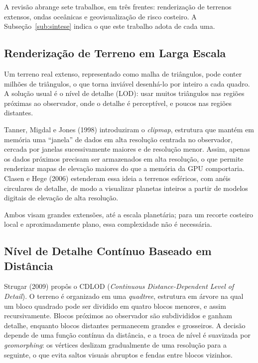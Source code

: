 \documentclass[conference]{IEEEtran}
\begin{document}
A revisão abrange sete trabalhos, em três frentes: renderização de terrenos
extensos, ondas oceânicas e geovisualização de risco costeiro. A
Subseção~\ref{sub:sintese} indica o que este trabalho adota de cada uma.

\subsection{Renderização de Terreno em Larga Escala}
\label{sub:terreno}

Um terreno real extenso, representado como malha de triângulos, pode
conter milhões de triângulos, o que torna inviável desenhá-lo por inteiro a
cada quadro. A solução usual é o nível de detalhe (LOD): usar muitos
triângulos nas regiões próximas ao observador, onde o detalhe é
perceptível, e poucos nas regiões distantes.

Tanner, Migdal e Jones (1998) introduziram o \emph{clipmap}, estrutura que
mantém em memória uma ``janela'' de dados em alta resolução centrada no
observador, cercada por janelas sucessivamente maiores e de resolução
menor. Assim, apenas os dados próximos precisam ser armazenados em alta
resolução, o que permite renderizar mapas de elevação maiores do que a
memória da GPU comportaria. Clasen e Hege (2006) estenderam essa ideia a
terrenos esféricos, com anéis circulares de detalhe, de modo a visualizar
planetas inteiros a partir de modelos digitais de elevação de alta
resolução.

Ambos visam grandes extensões, até a escala planetária; para um recorte
costeiro local e aproximadamente plano, essa complexidade não é necessária.

\subsection{Nível de Detalhe Contínuo Baseado em Distância}
\label{sub:cdlod-rel}

Strugar (2009) propôs o CDLOD (\emph{Continuous Distance-Dependent Level of
Detail}). O terreno é organizado em uma \emph{quadtree}, estrutura em
árvore na qual um bloco quadrado pode ser dividido em quatro blocos
menores, e assim recursivamente. Blocos próximos ao observador são
subdivididos e ganham detalhe, enquanto blocos distantes permanecem grandes
e grosseiros. A decisão depende de uma função contínua da distância, e a
troca de nível é suavizada por \emph{geomorphing}: os vértices deslizam
gradualmente de uma resolução para a seguinte, o que evita saltos visuais
abruptos e fendas entre blocos vizinhos.
\end{document}
